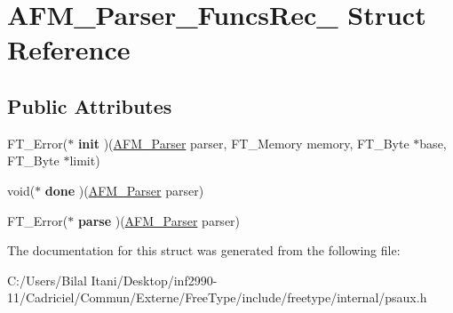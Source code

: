 \hypertarget{struct_a_f_m___parser___funcs_rec__}{}\section{A\+F\+M\+\_\+\+Parser\+\_\+\+Funcs\+Rec\+\_\+ Struct Reference}
\label{struct_a_f_m___parser___funcs_rec__}
\subsection*{Public Attributes}
\begin{DoxyCompactItemize}
\item 
F\+T\+\_\+\+Error($\ast$ {\bfseries init} )(\hyperlink{struct_a_f_m___parser_rec__}{A\+F\+M\+\_\+\+Parser} parser, F\+T\+\_\+\+Memory memory, F\+T\+\_\+\+Byte $\ast$base, F\+T\+\_\+\+Byte $\ast$limit)\hypertarget{struct_a_f_m___parser___funcs_rec___ab96ca52171618217bc852d01dbdaf4ad}{}\label{struct_a_f_m___parser___funcs_rec___ab96ca52171618217bc852d01dbdaf4ad}

\item 
void($\ast$ {\bfseries done} )(\hyperlink{struct_a_f_m___parser_rec__}{A\+F\+M\+\_\+\+Parser} parser)\hypertarget{struct_a_f_m___parser___funcs_rec___ae084d9f1b6768f93629073c9d1c98aee}{}\label{struct_a_f_m___parser___funcs_rec___ae084d9f1b6768f93629073c9d1c98aee}

\item 
F\+T\+\_\+\+Error($\ast$ {\bfseries parse} )(\hyperlink{struct_a_f_m___parser_rec__}{A\+F\+M\+\_\+\+Parser} parser)\hypertarget{struct_a_f_m___parser___funcs_rec___ad8f41aafada1b5a84f5e1ac46f545669}{}\label{struct_a_f_m___parser___funcs_rec___ad8f41aafada1b5a84f5e1ac46f545669}

\end{DoxyCompactItemize}


The documentation for this struct was generated from the following file\+:\begin{DoxyCompactItemize}
\item 
C\+:/\+Users/\+Bilal Itani/\+Desktop/inf2990-\/11/\+Cadriciel/\+Commun/\+Externe/\+Free\+Type/include/freetype/internal/psaux.\+h\end{DoxyCompactItemize}
